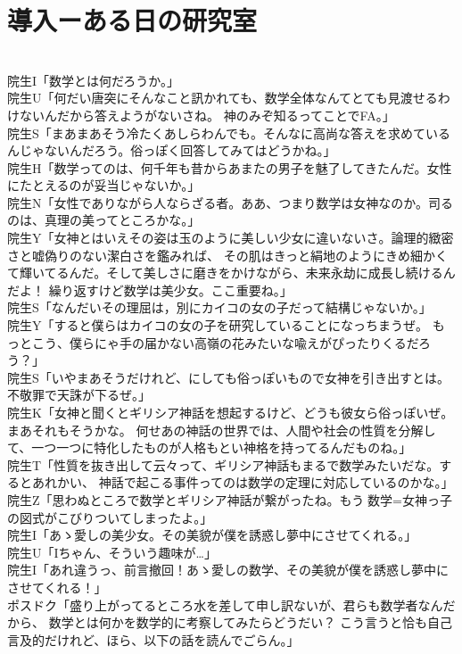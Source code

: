 \section{導入ーある日の研究室}\mbox{}\\
	院生I「数学とは何だろうか。」\\
	院生U「何だい唐突にそんなこと訊かれても、数学全体なんてとても見渡せるわけないんだから答えようがないさね。
		神のみぞ知るってことでFA。」\\
	院生S「まあまあそう冷たくあしらわんでも。そんなに高尚な答えを求めているんじゃないんだろう。俗っぽく回答してみてはどうかね。」\\
	院生H「数学ってのは、何千年も昔からあまたの男子を魅了してきたんだ。女性にたとえるのが妥当じゃないか。」\\
	院生N「女性でありながら人ならざる者。ああ、つまり数学は女神なのか。司るのは、真理の美ってところかな。」\\
	院生Y「女神とはいえその姿は玉のように美しい少女に違いないさ。論理的緻密さと嘘偽りのない潔白さを鑑みれば、
	その肌はきっと絹地のようにきめ細かくて輝いてるんだ。そして美しさに磨きをかけながら、未来永劫に成長し続けるんだよ！
	繰り返すけど数学は美少女。ここ重要ね。」\\
	院生S「なんだいその理屈は，別にカイコの女の子だって結構じゃないか。」\\
	院生Y「すると僕らはカイコの女の子を研究していることになっちまうぜ。
		もっとこう、僕らにゃ手の届かない高嶺の花みたいな喩えがぴったりくるだろう？」\\
	院生S「いやまあそうだけれど、にしても俗っぽいもので女神を引き出すとは。不敬罪で天誅が下るぜ。」\\
	院生K「女神と聞くとギリシア神話を想起するけど、どうも彼女ら俗っぽいぜ。まあそれもそうかな。
		何せあの神話の世界では、人間や社会の性質を分解して、一つ一つに特化したものが人格もとい神格を持ってるんだものね。」\\
	院生T「性質を抜き出して云々って、ギリシア神話もまるで数学みたいだな。するとあれかい、
		神話で起こる事件ってのは数学の定理に対応しているのかな。」\\
	院生Z「思わぬところで数学とギリシア神話が繋がったね。もう$\mbox{数学}=\mbox{女神っ子}$の図式がこびりついてしまったよ。」\\
	院生I「あゝ愛しの美少女。その美貌が僕を誘惑し夢中にさせてくれる。」\\
	院生U「Iちゃん、そういう趣味が…」\\
	院生I「あれ違うっ、前言撤回！あゝ愛しの数学、その美貌が僕を誘惑し夢中にさせてくれる！」\\
	ポスドク「盛り上がってるところ水を差して申し訳ないが、君らも数学者なんだから、
		数学とは何かを数学的に考察してみたらどうだい？
		こう言うと恰も自己言及的だけれど、ほら、以下の話を読んでごらん。」

